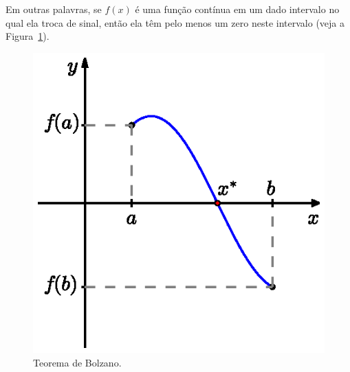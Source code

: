 Em outras palavras, se $f(x)$ é uma função contínua em um dado intervalo no qual ela troca de sinal, então ela têm pelo menos um zero neste intervalo (veja a Figura~\ref{fig:teorema_de_Bolzano}).

\begin{figure}
  \centering
  \includegraphics{./cap_equacao1d/pics/teorema_de_Bolzano/teorema_de_Bolzano.eps}
  \caption{Teorema de Bolzano.}
  \label{fig:teorema_de_Bolzano}
\end{figure}




